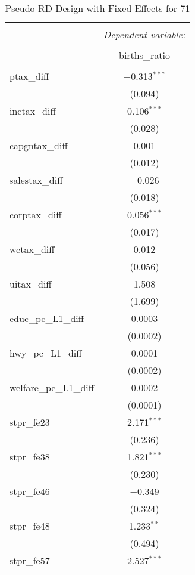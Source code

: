 
\begin{table}[!htbp] \centering 
  \caption{Pseudo-RD Design with Fixed Effects for  71} 
  \label{} 
\begin{tabular}{@{\extracolsep{5pt}}lc} 
\\[-1.8ex]\hline 
\hline \\[-1.8ex] 
 & \multicolumn{1}{c}{\textit{Dependent variable:}} \\ 
\cline{2-2} 
\\[-1.8ex] & births\_ratio \\ 
\hline \\[-1.8ex] 
 ptax\_diff & $-$0.313$^{***}$ \\ 
  & (0.094) \\ 
  inctax\_diff & 0.106$^{***}$ \\ 
  & (0.028) \\ 
  capgntax\_diff & 0.001 \\ 
  & (0.012) \\ 
  salestax\_diff & $-$0.026 \\ 
  & (0.018) \\ 
  corptax\_diff & 0.056$^{***}$ \\ 
  & (0.017) \\ 
  wctax\_diff & 0.012 \\ 
  & (0.056) \\ 
  uitax\_diff & 1.508 \\ 
  & (1.699) \\ 
  educ\_pc\_L1\_diff & 0.0003 \\ 
  & (0.0002) \\ 
  hwy\_pc\_L1\_diff & 0.0001 \\ 
  & (0.0002) \\ 
  welfare\_pc\_L1\_diff & 0.0002 \\ 
  & (0.0001) \\ 
  stpr\_fe23 & 2.171$^{***}$ \\ 
  & (0.236) \\ 
  stpr\_fe38 & 1.821$^{***}$ \\ 
  & (0.230) \\ 
  stpr\_fe46 & $-$0.349 \\ 
  & (0.324) \\ 
  stpr\_fe48 & 1.233$^{**}$ \\ 
  & (0.494) \\ 
  stpr\_fe57 & 2.527$^{***}$ \\ 

\end{tabular}
\end{table}
